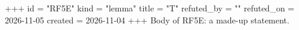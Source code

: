 +++
id = "RF5E"
kind = "lemma"
title = "T"
refuted_by = ""
refuted_on = 2026-11-05
created = 2026-11-04
+++
Body of RF5E: a made-up statement.
